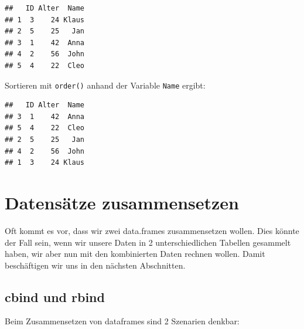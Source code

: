 \documentclass[
]{book}
\newenvironment{Shaded}{\begin{snugshade}}{\end{snugshade}}
\newcommand{\FunctionTok}[1]{\textcolor[rgb]{0.13,0.29,0.53}{\textbf{#1}}}
\newcommand{\NormalTok}[1]{#1}
\newcommand{\OtherTok}[1]{\textcolor[rgb]{0.56,0.35,0.01}{#1}}
\newcommand{\SpecialCharTok}[1]{\textcolor[rgb]{0.81,0.36,0.00}{\textbf{#1}}}
\newcommand{\StringTok}[1]{\textcolor[rgb]{0.31,0.60,0.02}{#1}}
\begin{document}
\begin{Shaded}
\end{Shaded}

\begin{verbatim}
##   ID Alter  Name
## 1  3    24 Klaus
## 2  5    25   Jan
## 3  1    42  Anna
## 4  2    56  John
## 5  4    22  Cleo
\end{verbatim}

Sortieren mit \texttt{order()} anhand der Variable \texttt{Name} ergibt:

\begin{Shaded}
\end{Shaded}

\begin{verbatim}
##   ID Alter  Name
## 3  1    42  Anna
## 5  4    22  Cleo
## 2  5    25   Jan
## 4  2    56  John
## 1  3    24 Klaus
\end{verbatim}

\section{Datensätze zusammensetzen}\label{datensuxe4tze-zusammensetzen}

Oft kommt es vor, dass wir zwei data.frames zusammensetzen wollen. Dies könnte der Fall sein, wenn wir unsere Daten in 2 unterschiedlichen Tabellen gesammelt haben, wir aber nun mit den kombinierten Daten rechnen wollen. Damit beschäftigen wir uns in den nächsten Abschnitten.

\subsection{cbind und rbind}\label{cbind-und-rbind}

Beim Zusammensetzen von dataframes sind 2 Szenarien denkbar:
\end{document}
